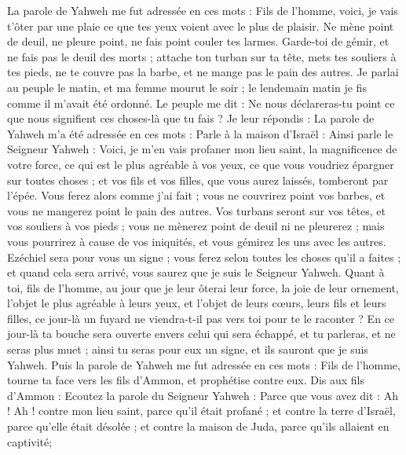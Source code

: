 \begin{multicols}{2}
La parole de Yahweh me fut adressée en ces mots :
Fils de l'homme, voici, je vais t'ôter par une plaie ce que tes yeux voient avec le plus de plaisir. Ne mène point de deuil, ne pleure point, ne fais point couler tes larmes.
Garde-toi de gémir, et ne fais pas le deuil des morts ; attache ton turban sur ta tête, mets tes souliers à tes pieds, ne te couvre pas la barbe, et ne mange pas le pain des autres.
Je parlai au peuple le matin, et ma femme mourut le soir ; le lendemain matin je fis comme il m'avait été ordonné.
Le peuple me dit : Ne nous déclareras-tu point ce que nous signifient ces choses-là que tu fais ?
Je leur répondis : La parole de Yahweh m'a été adressée en ces mots :
Parle à la maison d'Israël : Ainsi parle le Seigneur Yahweh : Voici, je m'en vais profaner mon lieu saint, la magnificence de votre force, ce qui est le plus agréable à vos yeux, ce que vous voudriez épargner sur toutes choses ; et vos fils et vos filles, que vous aurez laissés, tomberont par l'épée.
Vous ferez alors comme j'ai fait ; vous ne couvrirez point vos barbes, et vous ne mangerez point le pain des autres.
Vos turbans seront sur vos têtes, et vos souliers à vos pieds ; vous ne mènerez point de deuil ni ne pleurerez ; mais vous pourrirez à cause de vos iniquités, et vous gémirez les uns avec les autres.
Ezéchiel sera pour vous un signe ; vous ferez selon toutes les choses qu'il a faites ; et quand cela sera arrivé, vous saurez que je suis le Seigneur Yahweh.
Quant à toi, fils de l'homme, au jour que je leur ôterai leur force, la joie de leur ornement, l'objet le plus agréable à leurs yeux, et l'objet de leurs cœurs, leurs fils et leurs filles,
ce jour-là un fuyard ne viendra-t-il pas vers toi pour te le raconter ?
En ce jour-là ta bouche sera ouverte envers celui qui sera échappé, et tu parleras, et ne seras plus muet ; ainsi tu seras pour eux un signe, et ils sauront que je suis Yahweh.
\VerseOne{}Puis la parole de Yahweh me fut adressée en ces mots :
Fils de l'homme, tourne ta face vers les fils d'Ammon, et prophétise contre eux.
Dis aux fils d'Ammon : Ecoutez la parole du Seigneur Yahweh : Parce que vous avez dit : Ah ! Ah ! contre mon lieu saint, parce qu'il était profané ; et contre la terre d'Israël, parce qu'elle était désolée ; et contre la maison de Juda, parce qu'ils allaient en captivité;

\end{multicols}
